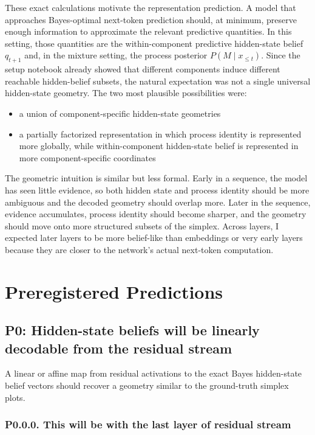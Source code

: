 \documentclass[11pt]{article}
\begin{document}
These exact calculations motivate the representation prediction. A model that approaches Bayes-optimal next-token prediction should, at minimum, preserve enough information to approximate the relevant predictive quantities. In this setting, those quantities are the within-component predictive hidden-state belief $q_{t+1}$ and, in the mixture setting, the process posterior $P(M \mid x_{\le t})$. Since the setup notebook already showed that different components induce different reachable hidden-belief subsets, the natural expectation was not a single universal hidden-state geometry. The two most plausible possibilities were:

\begin{itemize}
  \item a union of component-specific hidden-state geometries
  \item a partially factorized representation in which process identity is represented more globally, while within-component hidden-state belief is represented in more component-specific coordinates
\end{itemize}

The geometric intuition is similar but less formal. Early in a sequence, the model has seen little evidence, so both hidden state and process identity should be more ambiguous and the decoded geometry should overlap more. Later in the sequence, evidence accumulates, process identity should become sharper, and the geometry should move onto more structured subsets of the simplex. Across layers, I expected later layers to be more belief-like than embeddings or very early layers because they are closer to the network's actual next-token computation.

\section{Preregistered Predictions}

\subsection{P0: Hidden-state beliefs will be linearly decodable from the residual stream}

A linear or affine map from residual activations to the exact Bayes hidden-state belief vectors should recover a geometry similar to the ground-truth simplex plots.

\subsubsection*{P0.0.0. This will be with the last layer of residual stream}
\end{document}
